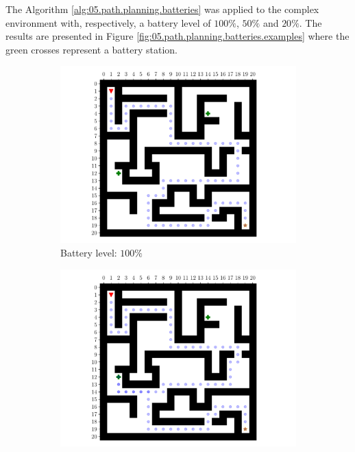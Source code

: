 The Algorithm \ref{alg:05.path.planning.batteries} was applied to the complex environment with, respectively, a battery level of $100\%$, $50\%$ and $20\%$. The results are presented in Figure \ref{fig:05.path.planning.batteries.examples} where the green crosses represent a battery station.

\begin{figure}[H]
    \centering
    \begin{subfigure}[b]{0.32\textwidth}
        \centering
        \includegraphics[width=\textwidth]{resources/pdf/05/complex-environment/b100.pdf}
        \caption{Battery level: $100\%$}
    \end{subfigure}
    \hfill
    \begin{subfigure}[b]{0.32\textwidth}
        \centering
        \includegraphics[width=\textwidth]{resources/pdf/05/complex-environment/b50.pdf}

\end{subfigure}
\end{figure}
